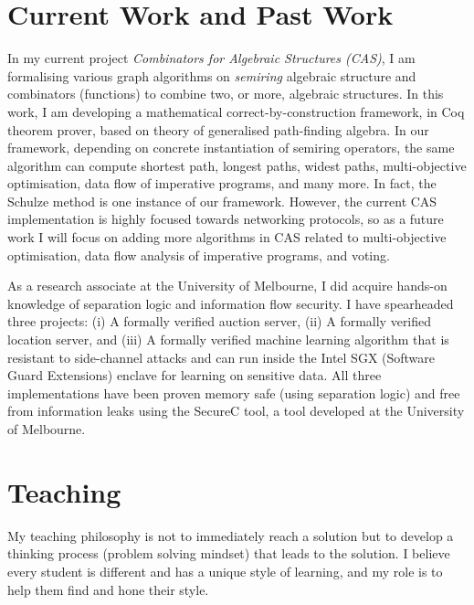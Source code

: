\documentclass[11pt,a4paper,roman]{moderncv}
\begin{document}
\section{Current Work and Past Work}
In my current project \emph{Combinators for Algebraic Structures (CAS)}, 
I am formalising various graph algorithms on \emph{semiring} algebraic 
structure and combinators (functions) to 
combine two, or more, algebraic structures. In this work, I am developing 
a mathematical correct-by-construction  
framework, in Coq theorem prover, based on theory of generalised path-finding algebra. 
In our framework, depending on concrete instantiation 
of semiring operators, the same algorithm can compute shortest path, longest paths, 
widest paths, multi-objective optimisation, data flow of imperative programs, and many more. 
In fact, the Schulze method is one instance of our framework. However, 
the current CAS implementation is highly focused towards networking protocols,
so as a future work I will focus on adding more algorithms in CAS related 
to multi-objective optimisation, data flow analysis of imperative programs, and voting. 




 As a research associate at the University of Melbourne, I did
 acquire hands-on knowledge of separation logic and information flow
 security. I have spearheaded three projects:
 (i) A formally verified auction server, (ii) A formally
 verified location server, and (iii) A formally verified machine learning 
 algorithm that is resistant to side-channel attacks and can  
 run inside the Intel SGX (Software Guard Extensions) enclave for learning
 on sensitive data. All three implementations have been proven 
 memory safe (using separation logic) and free from information
 leaks using the SecureC tool, a tool developed at the University of Melbourne.



 \section{Teaching}
My teaching philosophy is not to immediately reach a solution but to develop a 
thinking process (problem solving mindset) that leads to the solution. I believe every 
student is different and has a unique style of learning, and my role is to help them find 
and hone their style.
\end{document}
